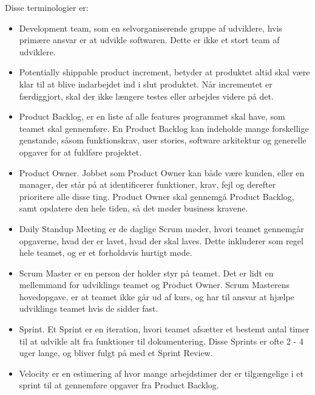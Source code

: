 Disse terminologier er\cite{Sommerville}: 
\begin{itemize}
    \item Development team, som en selvorganiserende gruppe af udviklere, hvis primære ansvar er at udvikle softwaren. Dette er ikke et stort team af udviklere. 
    
    \item Potentially shippable product increment, betyder at produktet altid skal være klar til at blive indarbejdet ind i slut produktet. Når incrementet er færdiggjort, skal der ikke længere testes eller arbejdes videre på det.
    
    \item Product Backlog, er en liste af alle features programmet skal have, som teamet skal gennemføre. En Product Backlog kan indeholde mange forskellige genstande, såsom funktionskrav, user stories, software arkitektur og generelle opgaver for at fuldføre projektet. 

    \item Product Owner. Jobbet som Product Owner kan både være kunden, eller en manager, der står på at identificerer funktioner, krav, fejl og derefter prioritere alle disse ting. Product Owner skal gennemgå Product Backlog, samt opdatere den hele tiden, så det møder business kravene. 
    
    \item Daily Standup Meeting er de daglige Scrum møder, hvori teamet gennemgår opgaverne, hvad der er lavet, hvad der skal laves. Dette inkluderer som regel hele teamet, og er et forholdsvis hurtigt møde. 
    
    \item Scrum Master er en person der holder styr på teamet. Det er lidt en mellemmand for udviklings teamet og Product Owner. Scrum Masterens hovedopgave, er at teamet ikke går ud af kurs, og har til ansvar at hjælpe udviklings teamet hvis de sidder fast. 
    
    \item Sprint. Et Sprint er en iteration, hvori teamet afsætter et bestemt antal timer til at udvikle alt fra funktioner til dokumentering. Disse Sprints er ofte 2 - 4 uger lange, og bliver fulgt på med et Sprint Review. 
    
    \item Velocity er en estimering af hvor mange arbejdstimer der er tilgængelige i et sprint til at gennemføre opgaver fra Product Backlog.
\end{itemize}

